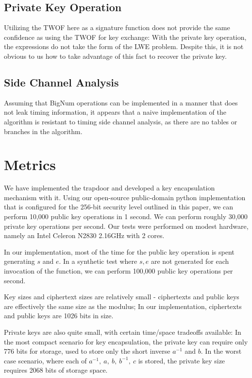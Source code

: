 \documentclass[preprint]{iacrtrans}
\begin{document}
\subsection{Private Key Operation}
Utilizing the TWOF here as a signature function does not provide the same confidence as using the TWOF for key exchange: With the private key operation, the expressions do not take the form of the LWE problem. Despite this, it is not obvious to us how to take advantage of this fact to recover the private key.

\subsection{Side Channel Analysis}
Assuming that BigNum operations can be implemented in a manner that does not leak timing information, it appears that a naive implementation of the algorithm is resistant to timing side channel analysis, as there are no tables or branches in the algorithm.

\section{Metrics}
We have implemented the trapdoor and developed a key encapsulation mechanism with it. Using our open-source public-domain python implementation that is configured for the 256-bit security level outlined in this paper, we can perform 10,000 public key operations in 1 second. We can perform roughly 30,000 private key operations per second. Our tests were performed on modest hardware, namely an Intel Celeron N2830 2.16GHz with 2 cores. 

In our implementation, most of the time for the public key operation is spent generating $s$ and $e$. In a synthetic test where $s, e$ are not generated for each invocation of the function, we can perform 100,000 public key operations per second.

Key sizes and ciphertext sizes are relatively small - ciphertexts and public keys are effectively the same size as the modulus; In our implementation, ciphertexts and public keys are 1026 bits in size.

Private keys are also quite small, with certain time/space tradeoffs available: In the most compact scenario for key encapsulation, the private key can require only 776 bits for storage, used to store only the short inverse $a^{-1}$ and $b$. In the worst case scenario, where each of $a^{-1},\ a,\ b,\ b^{-1},\ c$ is stored, the private key size requires 2068 bits of storage space. 
\end{document}
